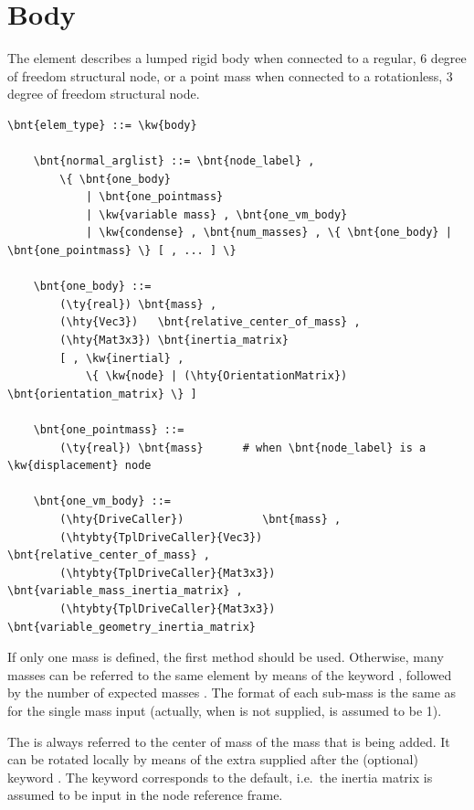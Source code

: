 \section{Body}
The  element describes a lumped rigid body when connected 
to a regular, 6 degree of freedom structural node, or a point mass
when connected to a rotationless, 3 degree of freedom structural node.
\begin{Verbatim}[commandchars=\\\{\}]
    \bnt{elem_type} ::= \kw{body}

    \bnt{normal_arglist} ::= \bnt{node_label} ,
        \{ \bnt{one_body}
            | \bnt{one_pointmass}
            | \kw{variable mass} , \bnt{one_vm_body}
            | \kw{condense} , \bnt{num_masses} , \{ \bnt{one_body} | \bnt{one_pointmass} \} [ , ... ] \}

    \bnt{one_body} ::=
        (\ty{real}) \bnt{mass} , 
        (\hty{Vec3})   \bnt{relative_center_of_mass} ,
        (\hty{Mat3x3}) \bnt{inertia_matrix}
        [ , \kw{inertial} , 
            \{ \kw{node} | (\hty{OrientationMatrix}) \bnt{orientation_matrix} \} ]

    \bnt{one_pointmass} ::=
        (\ty{real}) \bnt{mass}      # when \bnt{node_label} is a \kw{displacement} node

    \bnt{one_vm_body} ::=
        (\hty{DriveCaller})            \bnt{mass} ,
        (\htybty{TplDriveCaller}{Vec3})   \bnt{relative_center_of_mass} ,
        (\htybty{TplDriveCaller}{Mat3x3}) \bnt{variable_mass_inertia_matrix} ,
        (\htybty{TplDriveCaller}{Mat3x3}) \bnt{variable_geometry_inertia_matrix}
\end{Verbatim}
If only one mass is defined, the first method should be used. Otherwise,
many masses can be referred to the same element by means of the keyword
, followed by the number of expected masses .
The format of each sub-mass is the same as for the single mass input (actually, 
when  is not supplied,  is assumed to be 1).

The  is always referred to the center of mass of the
mass that is being added. It can be rotated locally by means of the extra
 supplied after the (optional) keyword .
The keyword  corresponds to the default, i.e.\ the inertia matrix
is assumed to be input in the node reference frame.


